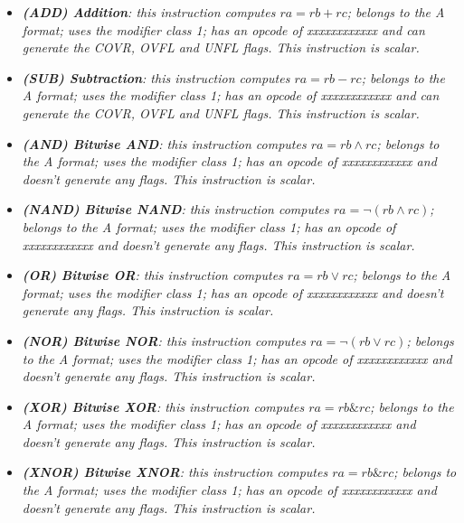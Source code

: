         \begin{multicols}{2}

            \begin{itemize}

                \item \textit{\textbf{(ADD) Addition}: this instruction computes \(ra = rb + rc\); belongs to the A format; uses the modifier class 1; has an opcode of xxxxxxxxxxxx and can generate the COVR, OVFL and UNFL flags. This instruction is scalar.}

                \item \textit{\textbf{(SUB) Subtraction}: this instruction computes \(ra = rb - rc\); belongs to the A format; uses the modifier class 1; has an opcode of xxxxxxxxxxxx and can generate the COVR, OVFL and UNFL flags. This instruction is scalar.}

                \item \textit{\textbf{(AND) Bitwise AND}: this instruction computes \(ra = rb \wedge rc\); belongs to the A format; uses the modifier class 1; has an opcode of xxxxxxxxxxxx and doesn't generate any flags. This instruction is scalar.}

                \item \textit{\textbf{(NAND) Bitwise NAND}: this instruction computes \(ra = \neg(rb \wedge rc)\); belongs to the A format; uses the modifier class 1; has an opcode of xxxxxxxxxxxx and doesn't generate any flags. This instruction is scalar.}

                \item \textit{\textbf{(OR) Bitwise OR}: this instruction computes \(ra = rb \vee rc\); belongs to the A format; uses the modifier class 1; has an opcode of xxxxxxxxxxxx and doesn't generate any flags. This instruction is scalar.}

                \item \textit{\textbf{(NOR) Bitwise NOR}: this instruction computes \(ra = \neg(rb \vee rc)\); belongs to the A format; uses the modifier class 1; has an opcode of xxxxxxxxxxxx and doesn't generate any flags. This instruction is scalar.}

                \item \textit{\textbf{(XOR) Bitwise XOR}: this instruction computes \(ra = rb \& rc\); belongs to the A format; uses the modifier class 1; has an opcode of xxxxxxxxxxxx and doesn't generate any flags. This instruction is scalar.}

                \item \textit{\textbf{(XNOR) Bitwise XNOR}: this instruction computes \(ra = rb \& rc\); belongs to the A format; uses the modifier class 1; has an opcode of xxxxxxxxxxxx and doesn't generate any flags. This instruction is scalar.}


\end{itemize}
\end{multicols}
